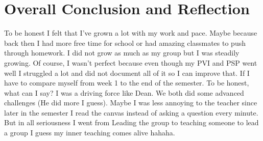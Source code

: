 \documentclass[12pt, letterpaper]{article}
\begin{document}
\section{Overall Conclusion and Reflection}
To be honest I felt that I've grown a lot with my work and pace. Maybe because back then I had more free time for school or had amazing classmates to push through homework. 
\hfill\break
\hfill\break
I did not grow as much as my group but I was steadily growing. Of course, I wasn't perfect because even though my PVI and PSP went well I struggled a lot and did not document all of it so I can improve that. 
\hfill\break
\hfill\break
If I have to compare myself from week 1 to the end of the semester. To be honest, what can I say? I was a driving force like Dean. We both did some advanced challenges (He did more I guess). Maybe I was less annoying to the teacher since later in the semester I read the canvas instead of asking a question every minute. But in all seriousness I went from Leading the group to teaching someone to lead a group I guess my inner teaching comes alive hahaha.
\end{document}
